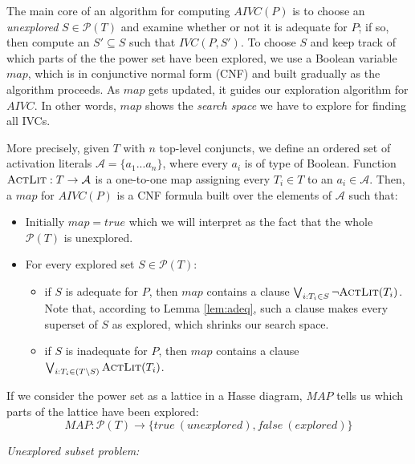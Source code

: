 \noindent The main core of an algorithm for computing $AIVC(P)$ is to choose an \emph{unexplored} $S \in \mathcal{P}(T)$ and examine whether or not it is adequate for $P$; if so, then compute an $S' \subseteq S$ such that $IVC(P, S')$. 
To choose $S$ and keep track of which parts of the the power set
have been explored, we use a Boolean variable $map$, which is
in conjunctive normal form (CNF) and built gradually as the algorithm proceeds. 
As $map$ gets updated, it guides our exploration algorithm for $AIVC$. 
In other words, $map$ shows the \emph{search space} we have to explore for finding all IVCs. 

More precisely, given $T$ with $n$ top-level conjuncts, 
we define an ordered
set of activation literals $\mathcal{A} = \{a_1...a_n\}$, where every $a_i$ is of type of Boolean. Function $\textsc{ActLit} : T \rightarrow \mathcal{A}$ 
is a one-to-one map assigning every $T_i \in T$ to an $a_i \in \mathcal{A}$. 
Then, a $map$ for $AIVC(P)$ is a CNF formula built over the elements of $\mathcal{A}$ such that:
\begin{itemize}
  \item Initially $map = true$ which we will interpret as the fact that the whole $\mathcal{P}(T)$ is unexplored.
  \item For every explored set $S \in \mathcal{P}(T)$: 
  \begin{itemize}
    \item if $S$ is adequate for $P$, then $map$ contains a clause $\bigvee_{i: T_{i}\in S} \neg {\textsc{ActLit}(T_i)}$. Note that, according to Lemma \ref{lem:adeq}, such a clause makes every superset of $S$ as explored, which shrinks our search space.
    \item if $S$ is inadequate for $P$, then $map$ contains a clause $\bigvee_{i: T_{i}\in (T \setminus S)} \textsc{ActLit} (T_i)$.
  \end{itemize}
\end{itemize}



If we consider the power set as a lattice in a Hasse diagram,
$MAP$ tells us which parts of the lattice have been explored:
$$MAP: \mathcal{P}(T) \rightarrow \{true~(unexplored), false~(explored)\}$$




\begin{definition}{\emph{Unexplored subset problem:}}
  \label{def:usp}
  
\end{definition}





